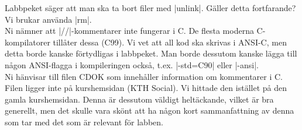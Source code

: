 \documentclass[paper=a4, fontsize=11pt]{scrartcl} %
\numberwithin{equation}{section} %
\numberwithin{figure}{section} %
\numberwithin{table}{section} %
\begin{document}
Labbpeket säger att man ska ta bort filer med |unlink|. Gäller detta fortfarande? Vi brukar använda |rm|.\\
Ni nämner att |//|-kommentarer inte fungerar i C. De flesta moderna C-kompilatorer tillåter dessa (C99). Vi vet att all kod ska skrivas i ANSI-C, men detta borde kanske förtydligas i labbpeket. Man borde dessutom kanske lägga till någon ANSI-flagga i kompileringen också, t.ex. |-std=C90| eller |-ansi|.\\

Ni hänvisar till filen CDOK som innehåller information om kommentarer i C. Filen ligger inte på kurshemsidan (KTH Social). Vi hittade den istället på den gamla kurshemsidan. Denna är dessutom väldigt heltäckande, vilket är bra generellt, men det skulle vara skönt att ha någon kort sammanfattning av denna som tar med det som är relevant för labben.
\end{document}
